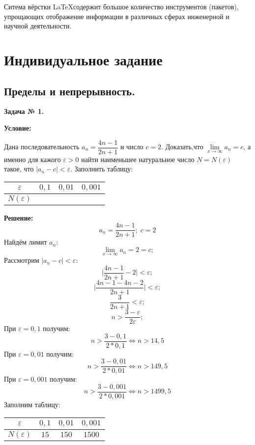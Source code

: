 \documentclass[12pt]{article}
\newcommand{\eps}{\varepsilon}
\begin{document}
Ситема вёрстки \LaTeX содержит большое количество инструментов (пакетов), упрощающих отображение информации в различных 
сферах инженерной и научной деятельности. 


\newpage
\section{Индивидуальное задание}



\subsection{Пределы и непрерывность.}

\begin{center}
\textbf{Задача № 1.}   
\end{center}

\textbf{Условие:}

Дана последовательность  $a_{n}=\dfrac{4n-1}{2n+1}$ и число $c=2$. Доказать,что $\lim\limits_{x\rightarrow\infty} a_{n}=c$, а именно для кажого $\eps > 0$ найти наименьшее натуральное число $N = N(\eps)$ такое, что $|a_{n}-c|<\eps$. Заполнить таблицу:
\begin{table}[h]
    \centering
    \begin{tabular}{|c|c|c|c|}
        \hline
         $\eps$ & $0,1$ & $0,01$ & $0,001$ \\
         \hline
         $N(\eps)$ &  &  & \\
         \hline
    \end{tabular}
\end{table}

\textbf{Решение:}
$$a_{n}=\dfrac{4n-1}{2n+1}; \; c = 2$$ 
Найдём лимит $a_{n}$:
$$\lim\limits_{x\rightarrow\infty} a_{n}= 2 = c;$$
Рассмотрим  $|a_{n}-c|<\eps$:
$$\biggl |\dfrac{4n-1}{2n+1} - 2  \biggr |<\eps;$$
$$\biggl |\dfrac{4n-1-4n-2}{2n+1} \biggr | <\eps;$$
$$\dfrac{3}{2n+1} < \eps;$$
$$n > \dfrac{3-\eps}{2\eps};$$
При $\eps = 0,1$ получим:
$$ n > \dfrac{3-0,1}{2*0,1} \Leftrightarrow n > 14,5$$
При $\eps = 0,01$ получим:
$$ n > \dfrac{3-0,01}{2*0,01} \Leftrightarrow n > 149,5$$
При $\eps = 0,001$ получим:
$$ n > \dfrac{3-0,001}{2*0,001} \Leftrightarrow n > 1499,5$$
Заполним таблицу:
\begin{table}[h]
    \centering
    \begin{tabular}{|c|c|c|c|}
        \hline
         $\eps$ & $0,1$ & $0,01$ & $0,001$ \\
         \hline
         $N(\eps)$ & $15$ & $150$  & $1500$ \\
         \hline
    \end{tabular}
\end{table}
\end{document}
